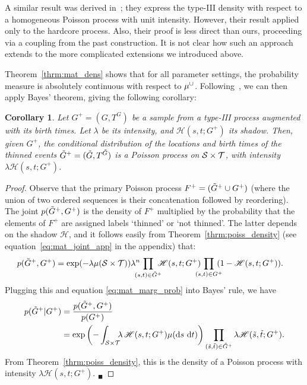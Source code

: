 \documentclass{statsoc}
\newtheorem{coro}[defn]{Corollary}
\begin{document}
A similar result was derived in~\cite{Hube:Wolp:2009}; they express the \matern type-III density with respect to a homogeneous Poisson 
process with unit intensity. However, their result applied only to the hardcore process. Also, their proof is less direct than ours, proceeding 
via a coupling from the past construction. It is not clear
how such an approach extends to the more complicated extensions we introduced above.

Theorem~\ref{thrm:mat_dens} shows that for all parameter settings, the \matern probability measure is absolutely continuous with respect to $\mu^{\cup}$.
Following~\citet[Theorem 3.14]{schervish95}, we can then apply Bayes' theorem, %
giving the following corollary: %
\begin{coro} \label{prop:mat_post} Let ${G^+ = (G, T^G)}$ be a sample from a \matern type-III process 
 augmented with its birth times. Let $\lambda$ be its intensity, and $\mathscr{H}(s,t;G^+)$ its shadow.
Then, given $G^+$, the conditional distribution of the locations and birth times of the thinned events
${\tilde{G}^+ = (\tilde{G},T^{\tilde{G}})}$ is a Poisson process on ${{\mathcal S} \times {\mathcal T}}$, with intensity $\lambda  \mathscr{H}(s,t; G^+)$.
\end{coro}
\begin{proof}
Observe that the primary Poisson process $F^+ = (\tilde{G}^+ \cup G^+)$ (where the union of two ordered sequences is their concatenation followed
by reordering).  The joint $p(\tilde{G}^+, G^+)$ is the density of $F^+$ multiplied by the
probability that the elements of $F^+$ are assigned labels `thinned' or `not thinned'. 
The latter depends on the shadow $\mathscr{H}$, and it follows easily from Theorem~\ref{thrm:poiss_density} 
(see equation~\eqref{eq:mat_joint_app} in the appendix) that:
\begin{align}
   p(\tG^+, G^+) &= \exp(-\lambda \mu(\cS \times \cT)) \lambda^{n}  \! \! \! \!\! \prod_{(s,t) \in \tG^+}  \! \! \! \!\mathscr{H}(s,t;G^+)  \! \! \! \! \! \prod_{(s,t) \in G^+}  \! \! \! \!(1- \mathscr{H}(s,t;G^+)). \label{eq:mat_joint}
\end{align}
Plugging this and equation \eqref{eq:mat_marg_prob} into Bayes' rule, we have
\begin{align}
  p(\tG^+ | G^+) &= \frac{p(\tG^+, G^+)}{p(G^+)} \\ %
  &= \exp \left(- \int_{\cS \times \cT} \!\!\!\lambda\, \mathscr{H}(s,t; G^+) \mu(\dif s\ \dif t) \right)
              \prod_{(\tilde{s},\tilde{t}) \in \tG^+} \lambda \mathscr{H}(\tilde{s}, \tilde{t}; G^+).  \label{eq:mat_post}
\end{align}
From Theorem~\ref{thrm:poiss_density}, this is the density of a Poisson process with intensity $\lambda \mathscr{H}(s, t; G^+)$. \hfill ${}_\blacksquare$ %
\end{proof}
\end{document}

